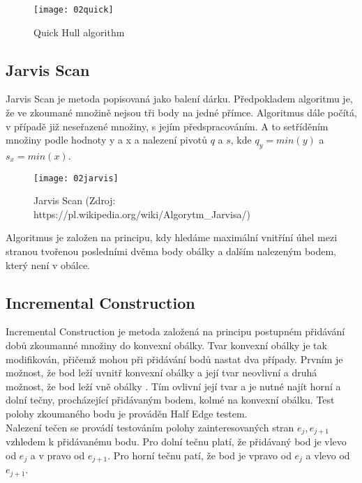 \documentclass{article}
\begin{document}
\begin{figure}[ht]
\begin{center}
\texttt{[image: 02quick]} %
\caption{Quick Hull algorithm}
\label{fig:wind}
\end{center}
\end{figure}

\subsection{Jarvis Scan}
Jarvis Scan je metoda popisovaná jako balení dárku. Předpokladem algoritmu je, že ve zkoumané množině nejsou tři body na jedné přímce. Algoritmus dále počítá, v případě již neseřazené množiny, s jejím předspracováním. A to setříděním množiny podle hodnoty y a x a nalezení pivotů $q$ a $s$, kde $q_y = min(y)$ a $s_x = min(x)$. 

\begin{figure}[h]
\begin{center}
\texttt{[image: 02jarvis]} %
\caption{Jarvis Scan (Zdroj: https://pl.wikipedia.org/wiki/Algorytm\_Jarvisa/)}
\label{fig:ray}
\end{center}
\end{figure}

Algoritmus je založen na principu, kdy hledáme maximální vnitříní úhel mezi stranou tvořenou posledními dvěma body obálky a dalším nalezeným bodem, který není v obálce.

\subsection{Incremental Construction}
Incremental Construction je metoda založená na principu postupném přidávání dobů zkoumanné množiny do konvexní obálky. Tvar konvexní obálky je tak modifikován, přičemž mohou při přidávání bodů nastat dva případy. Prvním je možnost, že bod leží uvnitř konvexní obálky a její tvar neovlivní a druhá možnost, že bod leží vně obálky . Tím ovlivní její tvar a je nutné najít horní a dolní tečny, procházející přidávaným bodem, kolmé na konvexní obálku. Test polohy zkoumaného bodu je prováděn Half Edge testem.\\

Nalezení tečen se provádí testováním polohy zainteresovaných stran $e_j, e_{j+1}$ vzhledem k přidávanému bodu. Pro dolní tečnu platí, že přidávaný bod je vlevo od $e_j$ a v pravo od $e_{j+1}$. Pro horní tečnu patí, že bod je vpravo od $e_j$ a vlevo od $e_{j+1}$.
\end{document}
